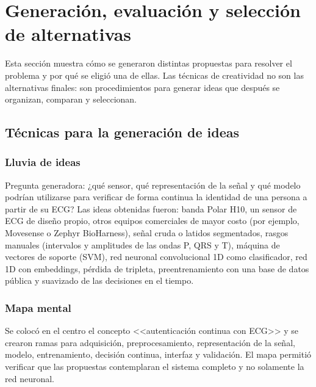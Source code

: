 \section{Generación, evaluación y selección de alternativas}
\label{sec:alternativas}

Esta sección muestra cómo se generaron distintas propuestas para resolver el problema y por qué se eligió una de ellas. Las técnicas de creatividad no son las alternativas finales: son procedimientos para generar ideas que después se organizan, comparan y seleccionan.


\subsection{Técnicas para la generación de ideas}

\subsubsection{Lluvia de ideas}

Pregunta generadora: ¿qué sensor, qué representación de la señal y qué modelo podrían utilizarse para verificar de forma continua la identidad de una persona a partir de su ECG? Las ideas obtenidas fueron: banda Polar H10, un sensor de ECG de diseño propio, otros equipos comerciales de mayor costo (por ejemplo, Movesense o Zephyr BioHarness), señal cruda o latidos segmentados, rasgos manuales (intervalos y amplitudes de las ondas P, QRS y T), máquina de vectores de soporte (SVM), red neuronal convolucional 1D como clasificador, red 1D con embeddings, pérdida de tripleta, preentrenamiento con una base de datos pública y suavizado de las decisiones en el tiempo. 

\subsubsection{Mapa mental}

Se colocó en el centro el concepto <<autenticación continua con ECG>> y se crearon ramas para adquisición, preprocesamiento, representación de la señal, modelo, entrenamiento, decisión continua, interfaz y validación. El mapa permitió verificar que las propuestas contemplaran el sistema completo y no solamente la red neuronal. 

